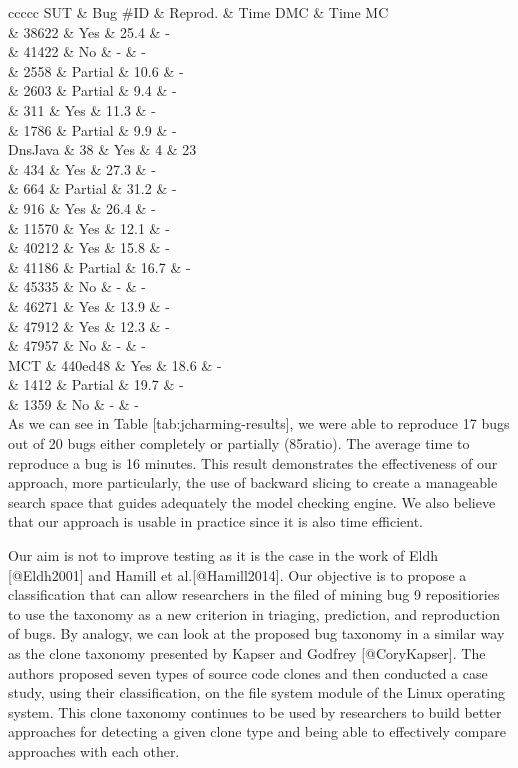 {c\textbar{}c\textbar{}c\textbar{}c\textbar{}c} SUT \& Bug \#ID \&
Reprod. \& Time DMC \& Time MC\\
\& 38622 \& Yes \& 25.4 \& -\\
\& 41422 \& No \& - \& -\\
\& 2558 \& Partial \& 10.6 \& -\\
\& 2603 \& Partial \& 9.4 \& -\\
\& 311 \& Yes \& 11.3 \& -\\
\& 1786 \& Partial \& 9.9 \& -\\
DnsJava \& 38 \& Yes \& 4 \& 23\\
\& 434 \& Yes \& 27.3 \& -\\
\& 664 \& Partial \& 31.2 \& -\\
\& 916 \& Yes \& 26.4 \& -\\
\& 11570 \& Yes \& 12.1 \& -\\
\& 40212 \& Yes \& 15.8 \& -\\
\& 41186 \& Partial \& 16.7 \& -\\
\& 45335 \& No \& - \& -\\
\& 46271 \& Yes \& 13.9 \& -\\
\& 47912 \& Yes \& 12.3 \& -\\
\& 47957 \& No \& - \& -\\
MCT \& 440ed48 \& Yes \& 18.6 \& -\\
\& 1412 \& Partial \& 19.7 \& -\\
\& 1359 \& No \& - \& -\\
As we can see in Table {[}tab:jcharming-results{]}, we were able to
reproduce 17 bugs out of 20 bugs either completely or partially
(85ratio). The average time to reproduce a bug is 16 minutes. This
result demonstrates the effectiveness of our approach, more
particularly, the use of backward slicing to create a manageable search
space that guides adequately the model checking engine. We also believe
that our approach is usable in practice since it is also time efficient.

Our aim is not to improve testing as it is the case in the work of Eldh
{[}@Eldh2001{]} and Hamill et al.{[}@Hamill2014{]}. Our objective is to
propose a classification that can allow researchers in the filed of
mining bug 9 repositiories to use the taxonomy as a new criterion in
triaging, prediction, and reproduction of bugs. By analogy, we can look
at the proposed bug taxonomy in a similar way as the clone taxonomy
presented by Kapser and Godfrey {[}@CoryKapser{]}. The authors proposed
seven types of source code clones and then conducted a case study, using
their classification, on the file system module of the Linux operating
system. This clone taxonomy continues to be used by researchers to build
better approaches for detecting a given clone type and being able to
effectively compare approaches with each other.

